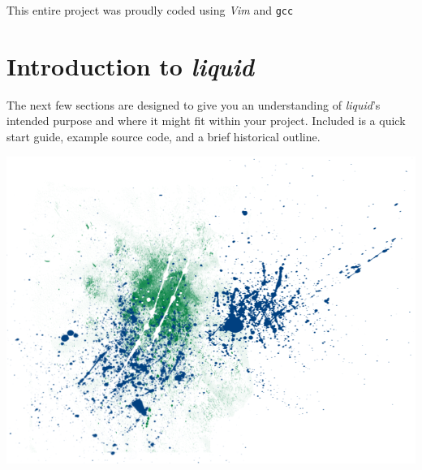 \documentclass[11pt,twoside]{article}
\newcommand{\liquid}{{\it liquid}}
\begin{document}
\vfill

\noindent
{\footnotesize This entire project was proudly coded using {\em Vim} and {\tt gcc}}

\pagebreak
%
%
\tableofcontents
\pagebreak




\pagestyle{headings}

%
%

\newpage
\part{Introduction to \liquid }
\label{part:intro}

\bigskip
\noindent
The next few sections are designed to give you an understanding of
\liquid's intended purpose and where it might fit within your project.
Included is a quick start guide, example source code, and a brief
historical outline.

\vfill

\includegraphics[width=\textwidth]{graphics/liquid_splatter_01.png}
\end{document}
